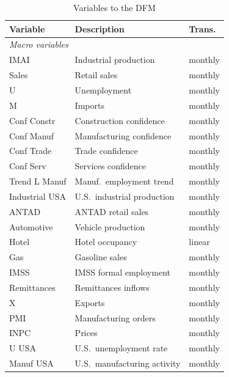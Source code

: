 \documentclass[12pt]{article}
\begin{document}





\appendix


\begin{table}
\centering
\caption{Variables to the DFM}\label{tab:all-dfm-vars}
\begin{tabular}{lll}
\hline
\textbf{Variable} & \textbf{Description} & \textbf{Trans.} \\
\hline
\multicolumn{3}{l}{\textit{Macro variables}} \\
\hline
IMAI             & Industrial production          & monthly \\
Sales            & Retail sales                   & monthly \\
U                & Unemployment                   & monthly \\
M                & Imports                        & monthly \\
Conf Constr      & Construction confidence        & monthly \\
Conf Manuf       & Manufacturing confidence       & monthly \\
Conf Trade 		& Trade confidence  & monthly \\
Conf Serv        & Services confidence            & monthly \\
Trend L Manuf    & Manuf.\ employment trend       & monthly \\
Industrial USA   & U.S.\ industrial production    & monthly \\
ANTAD            & ANTAD retail sales             & monthly \\
Automotive       & Vehicle production             & monthly \\
Hotel            & Hotel occupancy                & linear  \\
Gas              & Gasoline sales                 & monthly \\
IMSS             & IMSS formal employment         & monthly \\
Remittances      & Remittances inflows            & monthly \\
X                & Exports                        & monthly \\
PMI              & Manufacturing orders           & monthly \\
INPC & Prices & monthly 
\\
U USA            & U.S.\ unemployment rate        & monthly \\
Manuf USA        & U.S.\ manufacturing activity   & monthly \\

\end{tabular}
\end{table}
\end{document}
